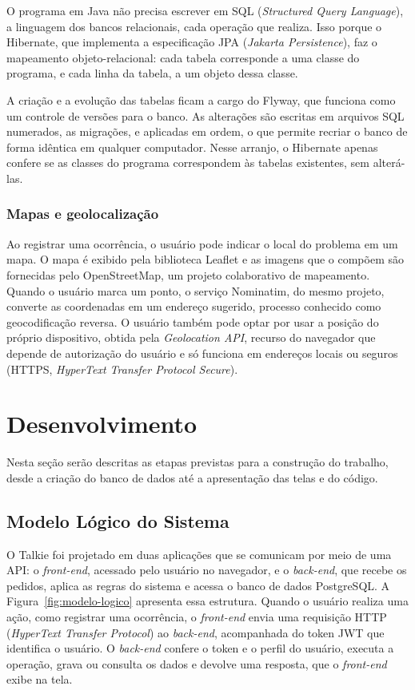 \documentclass[12pt,a4paper]{article}
\begin{document}
O programa em Java não precisa escrever em SQL (\textit{Structured Query Language}), a linguagem dos bancos relacionais, cada operação que realiza. Isso porque o Hibernate, que implementa a especificação JPA (\textit{Jakarta Persistence}), faz o mapeamento objeto-relacional: cada tabela corresponde a uma classe do programa, e cada linha da tabela, a um objeto dessa classe.

A criação e a evolução das tabelas ficam a cargo do Flyway, que funciona como um controle de versões para o banco. As alterações são escritas em arquivos SQL numerados, as migrações, e aplicadas em ordem, o que permite recriar o banco de forma idêntica em qualquer computador. Nesse arranjo, o Hibernate apenas confere se as classes do programa correspondem às tabelas existentes, sem alterá-las.

\subsubsection{Mapas e geolocalização}
Ao registrar uma ocorrência, o usuário pode indicar o local do problema em um mapa. O mapa é exibido pela biblioteca Leaflet e as imagens que o compõem são fornecidas pelo OpenStreetMap, um projeto colaborativo de mapeamento. Quando o usuário marca um ponto, o serviço Nominatim, do mesmo projeto, converte as coordenadas em um endereço sugerido, processo conhecido como geocodificação reversa. O usuário também pode optar por usar a posição do próprio dispositivo, obtida pela \textit{Geolocation API}, recurso do navegador que depende de autorização do usuário e só funciona em endereços locais ou seguros (HTTPS, \textit{HyperText Transfer Protocol Secure}).


\section{Desenvolvimento}
Nesta seção serão descritas as etapas previstas para a construção do trabalho,
desde a criação do banco de dados até a apresentação das telas e do código.

\subsection{Modelo Lógico do Sistema}
O Talkie foi projetado em duas aplicações que se comunicam por meio de uma API: o \textit{front-end}, acessado pelo usuário no navegador, e o \textit{back-end}, que recebe os pedidos, aplica as regras do sistema e acessa o banco de dados PostgreSQL. A Figura~\ref{fig:modelo-logico} apresenta essa estrutura. Quando o usuário realiza uma ação, como registrar uma ocorrência, o \textit{front-end} envia uma requisição HTTP (\textit{HyperText Transfer Protocol}) ao \textit{back-end}, acompanhada do token JWT que identifica o usuário. O \textit{back-end} confere o token e o perfil do usuário, executa a operação, grava ou consulta os dados e devolve uma resposta, que o \textit{front-end} exibe na tela.
\end{document}
